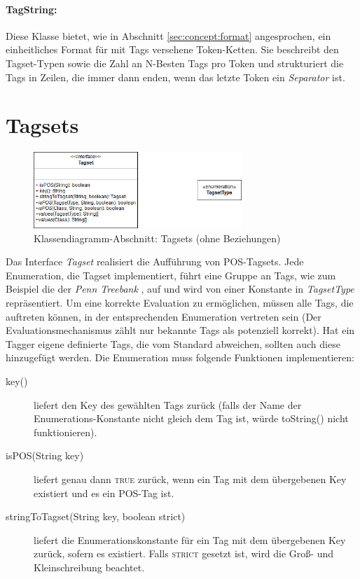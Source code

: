 \paragraph{TagString:} Diese Klasse bietet, wie in Abschnitt \ref{sec:concept:format} angesprochen, ein einheitliches Format für mit Tags versehene Token-Ketten. Sie beschreibt den Tagset-Typen sowie die Zahl an N-Besten Tags pro Token und strukturiert die Tags in Zeilen, die immer dann enden, wenn das letzte Token ein \textit{Separator} ist. 

\section{Tagsets}
\label{sec:impl:tagset}


\begin{figure}[htb]
	\centering
	\captionsetup{justification=centering,margin=2cm}
	\includegraphics[width=0.7\textwidth]{gfx/tagset_uml.jpg}
	
	\caption{Klassendiagramm-Abschnitt: Tagsets (ohne Beziehungen)} 
	\label{fig:impl:tagset:uml}
\end{figure}

Das Interface \textit{Tagset} realisiert die Aufführung von POS-Tagsets.
Jede Enumeration, die Tagset implementiert, führt eine Gruppe an Tags, wie zum Beispiel die der \textit{Penn Treebank} \cite{Paper:PennBank}, auf und wird von einer Konstante in \textit{TagsetType} repräsentiert. Um eine korrekte Evaluation zu ermöglichen, müssen alle Tags, die auftreten können, in der entsprechenden Enumeration vertreten sein (Der Evaluationsmechanismus zählt nur bekannte Tags als potenziell korrekt). Hat ein Tagger eigene definierte Tags, die vom Standard abweichen, sollten auch diese hinzugefügt werden. Die Enumeration muss folgende Funktionen implementieren:
\begin{description}
\item[key()] liefert den Key des gewählten Tags zurück (falls der Name der Enumerations-Konstante nicht gleich dem Tag ist, würde toString() nicht funktionieren).
\item[isPOS(String key)] liefert genau dann \textsc{true} zurück, wenn ein Tag mit dem übergebenen Key existiert und es ein POS-Tag ist.
\item[stringToTagset(String key, boolean strict)] liefert die Enumerationskonstante für ein Tag mit dem übergebenen Key zurück, sofern es existiert. Falls \textsc{strict} gesetzt ist, wird die Groß- und Kleinschreibung beachtet.
\end{description}

